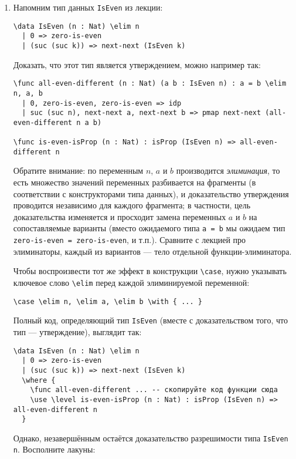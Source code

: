 \documentclass[10pt,a4paper,oneside]{article}
\begin{document}
\begin{enumerate}
\item Напомним тип данных \verb!IsEven! из лекции:

\begin{verbatim}
\data IsEven (n : Nat) \elim n
  | 0 => zero-is-even
  | (suc (suc k)) => next-next (IsEven k)
\end{verbatim}

Доказать, что этот тип является утверждением, можно например так:

\begin{verbatim}
\func all-even-different (n : Nat) (a b : IsEven n) : a = b \elim n, a, b
  | 0, zero-is-even, zero-is-even => idp
  | suc (suc n), next-next a, next-next b => pmap next-next (all-even-different n a b)

\func is-even-isProp (n : Nat) : isProp (IsEven n) => all-even-different n
\end{verbatim}

Обратите внимание: по переменным $n$, $a$ и $b$ производится \emph{элиминация}, то есть множество 
значений переменных разбивается на фрагменты (в соответствии с конструкторами типа данных), 
и доказательство утверждения проводится независимо для каждого фрагмента; 
в частности, цель доказательства изменяется и просходит замена переменных $a$ и $b$ на сопоставляемые
варианты (вместо ожидаемого типа \verb!a = b! мы ожидаем тип \verb!zero-is-even = zero-is-even!, и т.п.).
Сравните с лекцией про элиминаторы, каждый из вариантов --- тело отдельной функции-элиминатора. 

Чтобы воспроизвести тот же эффект в конструкции \verb!\case!, нужно указывать ключевое слово 
\verb!\elim! перед каждой элиминируемой переменной: 
\begin{verbatim}
\case \elim n, \elim a, \elim b \with { ... }
\end{verbatim}

Полный код, определяющий тип \verb!IsEven! (вместе с доказательством того, что тип --- утверждение),
выглядит так:

\begin{verbatim}
\data IsEven (n : Nat) \elim n
  | 0 => zero-is-even
  | (suc (suc k)) => next-next (IsEven k)
  \where {
    \func all-even-different ... -- скопируйте код функции сюда
    \use \level is-even-isProp (n : Nat) : isProp (IsEven n) => all-even-different n
  }
\end{verbatim}

Однако, незавершённым остаётся доказательство разрешимости типа \verb!IsEven n!. Восполните лакуны:


\end{enumerate}
\end{document}
